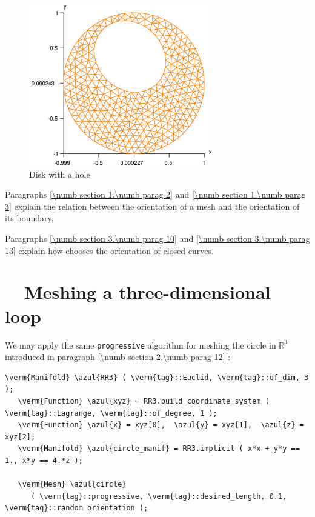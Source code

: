 \begin{figure}[ht] \centering
 \includegraphics[width=80mm]{disk-with-hole}
  \caption{Disk with a hole}
  \label{\numb section 3.\numb fig 2}
\end{figure}

Paragraphs \ref{\numb section 1.\numb parag 2} and \ref{\numb section 1.\numb parag 3} explain
the relation between the orientation of a mesh and the orientation of its boundary.

Paragraphs \ref{\numb section 3.\numb parag 10} and \ref{\numb section 3.\numb parag 13}
explain how {\maniFEM} chooses the orientation of closed curves.


\section{~~Meshing a three-dimensional loop}\label{\numb section 3.\numb parag 4}

We may apply the same {\small\tt progressive} algorithm for meshing the circle in
$ \mathbb{R}^3 $ introduced in paragraph \ref{\numb section 2.\numb parag 12} :

\begin{Verbatim}[commandchars=\\\{\},formatcom=\small\tt,frame=single,
   label=parag-\ref{\numb section 3.\numb parag 4}.cpp,rulecolor=\color{coment},
   baselinestretch=0.94,framesep=2mm                                            ]
   \verm{Manifold} \azul{RR3} ( \verm{tag}::Euclid, \verm{tag}::of_dim, 3 );
   \verm{Function} \azul{xyz} = RR3.build_coordinate_system ( \verm{tag}::Lagrange, \verm{tag}::of_degree, 1 );
   \verm{Function} \azul{x} = xyz[0],  \azul{y} = xyz[1],  \azul{z} = xyz[2];
   \verm{Manifold} \azul{circle_manif} = RR3.implicit ( x*x + y*y == 1., x*y == 4.*z );
   
   \verm{Mesh} \azul{circle}
      ( \verm{tag}::progressive, \verm{tag}::desired_length, 0.1, \verm{tag}::random_orientation );
\end{Verbatim}

